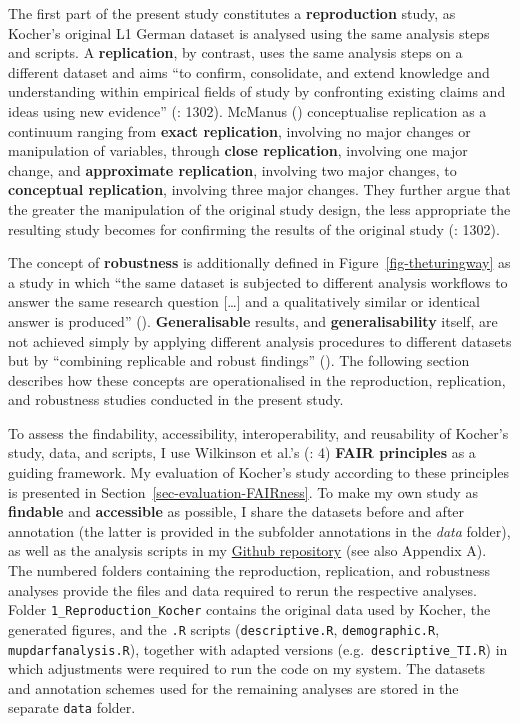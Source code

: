 \documentclass[
  letterpaper,
  DIV=11,
  numbers=noendperiod]{scrartcl}
\begin{document}
The first part of the present study constitutes a \textbf{reproduction}
study, as Kocher's original L1 German dataset is analysed using the same
analysis steps and scripts. A \textbf{replication}, by contrast, uses
the same analysis steps on a different dataset and aims ``to confirm,
consolidate, and extend knowledge and understanding within empirical
fields of study by confronting existing claims and ideas using new
evidence'' (: 1302). McManus
() conceptualise replication as a
continuum ranging from \textbf{exact replication}, involving no major
changes or manipulation of variables, through \textbf{close
replication}, involving one major change, and \textbf{approximate
replication}, involving two major changes, to \textbf{conceptual
replication}, involving three major changes. They further argue that the
greater the manipulation of the original study design, the less
appropriate the resulting study becomes for confirming the results of
the original study (: 1302).

The concept of \textbf{robustness} is additionally defined in
Figure~\ref{fig-theturingway} as a study in which ``the same dataset is
subjected to different analysis workflows to answer the same research
question {[}\ldots{]} and a qualitatively similar or identical answer is
produced'' (). \textbf{Generalisable} results, and
\textbf{generalisability} itself, are not achieved simply by applying
different analysis procedures to different datasets but by ``combining
replicable and robust findings''
(). The following section describes how these concepts are
operationalised in the reproduction, replication, and robustness studies
conducted in the present study.

To assess the findability, accessibility, interoperability, and
reusability of Kocher's study, data, and scripts, I use Wilkinson et
al.'s (: 4) \textbf{FAIR principles}
as a guiding framework. My evaluation of Kocher's study according to
these principles is presented in Section~\ref{sec-evaluation-FAIRness}.
To make my own study as \textbf{findable} and \textbf{accessible} as
possible, I share the datasets before and after annotation (the latter
is provided in the subfolder annotations in the \emph{data} folder), as
well as the analysis scripts in my
\href{https://github.com/TizianaIlie/Github_thesis_TizianaIlie}{Github
repository} (see also Appendix A). The numbered folders containing the
reproduction, replication, and robustness analyses provide the files and
data required to rerun the respective analyses. Folder
\texttt{1\_Reproduction\_Kocher} contains the original data used by
Kocher, the generated figures, and the \texttt{.R} scripts
(\texttt{descriptive.R}, \texttt{demographic.R},
\texttt{mupdarfanalysis.R}), together with adapted versions
(e.g.~\texttt{descriptive\_TI.R}) in which adjustments were required to
run the code on my system. The datasets and annotation schemes used for
the remaining analyses are stored in the separate \texttt{data} folder.
\end{document}
